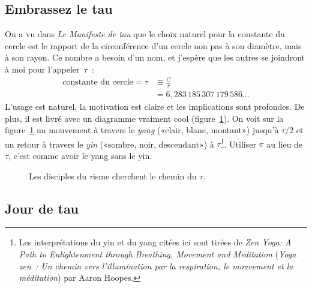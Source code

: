 
  \subsection{Embrassez le tau} %
  \label{sec:embrace_the_tau}

On a vu dans \emph{Le Manifeste de tau} que le choix naturel pour la constante
du cercle est le rapport de la circonférence d'un cercle non pas à son diamètre,
mais à son rayon. Ce nombre a besoin d'un nom, et j'espère que les autres se
joindront à moi pour l'appeler~$\tau$~:
\[
\begin{split}
\mbox{constante du cercle} = \tau & \equiv \frac{C}{r} \\
                                  & = 6{,}283\,185\,307\,179\,586\ldots
\end{split}
\]
L'usage est naturel, la motivation est claire et les implications sont
profondes. De plus, il est livré avec un diagramme vraiment cool
(figure~\ref{fig:tauism}). On voit sur la figure~\ref{fig:tauism} un mouvement à
travers le \emph{yang} («\ns clair, blanc, montant\ns ») jusqu'à $\tau/2$ et un
retour à travers le \emph{yin} («\ns sombre, noir, descendant\ns ») à
$\tau$\ns\footnote{Les interprétations du yin et du yang citées ici sont tirées
de \emph{Zen Yoga: A Path to Enlightenment through Breathing, Movement and
Meditation} (\emph{Yoga zen~: Un chemin vers l'illumination par la respiration,
le mouvement et la méditation}) par Aaron Hoopes.}. Utiliser $\pi$ au lieu de
$\tau$, c'est comme avoir le yang sans le yin.

\begin{figure}
\begin{center}
\end{center}
\caption{Les disciples du $\tau$isme cherchent le chemin du
$\tau$.\label{fig:tauism}}
\end{figure}



  \subsection{Jour de tau} %
  \label{sec:tau_day}

